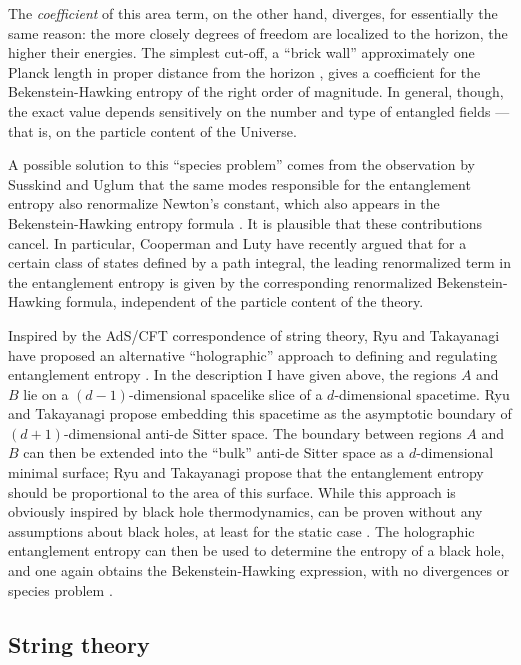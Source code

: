 \documentclass[11pt]{article}
\begin{document}
The \emph{coefficient} of this area term, on the other hand, diverges, 
for  essentially the same reason: the more closely degrees of 
freedom are localized to the horizon, the higher their energies.
The simplest cut-off, a ``brick wall'' approximately one Planck
length in proper distance from the horizon \cite{tHooft}, gives a
coefficient for the Bekenstein-Hawking entropy of the right order
of magnitude.  In general, though, the exact value depends
sensitively on the number and type of entangled fields --- that
is, on the particle content of the Universe.

A possible solution to this ``species problem'' comes from the
observation by Susskind and Uglum that the same modes responsible
for the entanglement entropy also renormalize Newton's constant,
which also appears in the Bekenstein-Hawking entropy formula
\cite{SussUg}.  It is plausible that these contributions cancel.  In
particular, Cooperman and Luty \cite{Coop} have recently argued 
that for a certain class of states defined by a path integral, the
leading renormalized term in the entanglement entropy is given by
the corresponding renormalized Bekenstein-Hawking formula,
independent of the particle content of the theory.

Inspired by the AdS/CFT correspondence of string theory, Ryu
and Takayanagi have proposed an alternative ``holographic'' 
approach to defining and regulating entanglement entropy
\cite{Ryu,Hubeny}.  In the description I have given above, the
regions $A$ and $B$ lie on a $(d-1)$-dimensional spacelike 
slice of a $d$-dimensional spacetime.  Ryu and Takayanagi
propose embedding this spacetime as the asymptotic boundary 
of $(d+1)$-dimensional anti-de Sitter space.  The boundary 
between regions $A$ and $B$ can then be extended into the ``bulk'' 
anti-de Sitter space as a $d$-dimensional minimal surface; Ryu 
and Takayanagi propose that the entanglement entropy should 
be proportional to the area of this surface.  While this approach 
is obviously inspired by black hole thermodynamics, can be 
proven without any assumptions about black holes, at least for 
the static case \cite{Lewkowycz}.  The holographic entanglement 
entropy can then be used to determine the entropy of a black hole, 
and one again obtains the Bekenstein-Hawking expression, with no 
divergences or species problem \cite{Emparanb}.

\subsection{String theory}
\end{document}
